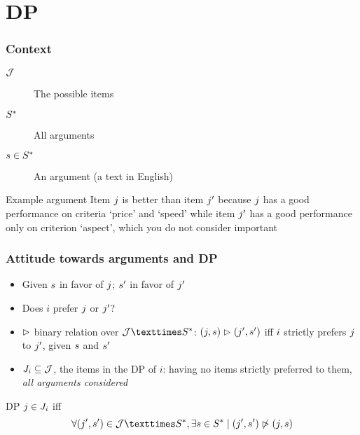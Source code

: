 \documentclass[french,english]{beamer}
\begin{document}
\section{\acl{DP}}
\begin{frame}
	\frametitle{Context}
	\begin{description}
		\item[$\mathcal{J}$] The possible items 
		\item[$S^*$] All arguments 
		\item[$s \in S^*$] An argument (a text in English)
	\end{description}
	\begin{exampleblock}{Example argument}
		Item $j$ is better than item $j'$ because $j$ has a good performance on criteria ‘price’ and ‘speed’ while item $j'$ has a good performance only on criterion ‘aspect’, which you do not consider important
	\end{exampleblock}
\end{frame}

\begin{frame}
	\frametitle{Attitude towards arguments and \acl{DP}}
	\begin{itemize}
		\item Given $s$ in favor of $j$; $s'$ in favor of $j'$
		\item Does $i$ prefer $j$ or $j'$?
		\item $\vartriangleright$ binary relation over $\allitems × \allargs$: $(j, s) \vartriangleright (j', s')$ iff $i$ strictly prefers $j$ to $j'$, given $s$ and $s'$
		\item $J_i \subseteq \mathcal{J}$, the items in the \ac{DP} of $i$: having no items strictly preferred to them, \emph{all arguments considered}
	\end{itemize}
	\begin{block}{\acl{DP}}
		$j \in J_i$ iff
		\begin{equation}
			\forall (\itm', \ar') \in \allitems × \allargs, \exists \ar \in \allargs \suchthat (\itm', \ar') \nibeats (\itm, \ar)
		\end{equation}
	\end{block}
\end{frame}
\end{document}
